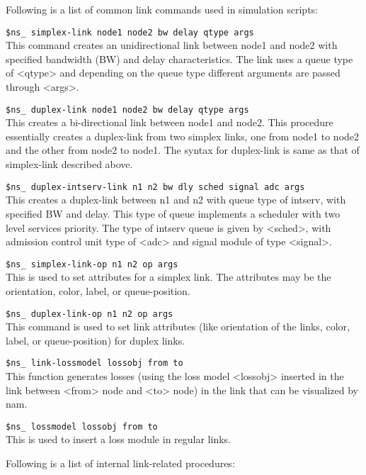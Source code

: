 Following is a list of common link commands used in simulation scripts:
\begin{flushleft}

{\tt \$ns\_ simplex-link \<node1\> \<node2\> \<bw\> \<delay\> \<qtype\> \<args\>}\\
This command creates an unidirectional link between node1 and node2 with
specified bandwidth (BW) and delay characteristics. The link uses a queue
type of <qtype> and depending on the queue type different arguments are
passed through <args>.


{\tt \$ns\_ duplex-link \<node1\> \<node2\> \<bw\> \<delay\> \<qtype\> \<args\>}\\
This creates a bi-directional link between node1 and node2. This procedure
essentially creates a duplex-link from two simplex links, one from node1
to node2 and the other from node2 to node1. The syntax for duplex-link is
same as that of simplex-link described above.


{\tt \$ns\_ duplex-intserv-link \<n1\> \<n2\> \<bw\> \<dly\> \<sched\> \<signal\> \<adc\> \<args\>}\\
This creates a duplex-link between n1 and n2 with queue type of intserv, with
specified BW and delay. This type of queue implements a scheduler with two
level services priority. The type of intserv queue is given by <sched>, with
admission control unit type of <adc> and signal module of type <signal>.


{\tt \$ns\_ simplex-link-op \<n1\> \<n2\> \<op\> \<args\>}\\
This is used to set attributes for a simplex link. The attributes may be
the orientation, color, label, or queue-position.


{\tt \$ns\_ duplex-link-op \<n1\> \<n2\> \<op\> \<args\>}\\
This command is used to set link attributes (like orientation of the links,
color, label, or queue-position) for duplex links.


{\tt \$ns\_ link-lossmodel \<lossobj\> \<from\> \<to\>}\\
This function generates losses (using the loss model <lossobj> inserted in
the link between <from> node and <to> node) in the link that can be
visualized by nam.


{\tt \$ns\_ lossmodel \<lossobj\> \<from\> \<to\>}\\
This is used to insert a loss module in regular links.



Following is a list of internal link-related procedures:


\end{flushleft}
